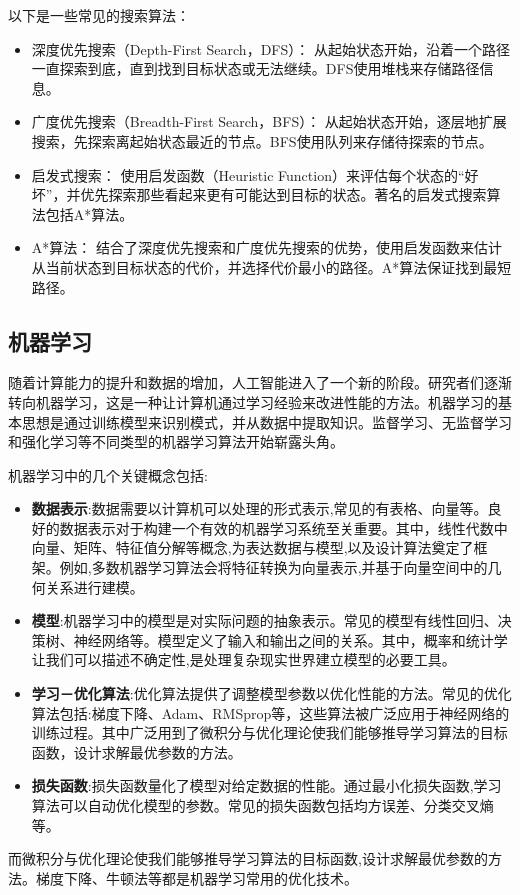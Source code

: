 以下是一些常见的搜索算法：
\begin{itemize}
\item 深度优先搜索（Depth-First Search，DFS）： 从起始状态开始，沿着一个路径一直探索到底，直到找到目标状态或无法继续。DFS使用堆栈来存储路径信息。
\item 广度优先搜索（Breadth-First Search，BFS）： 从起始状态开始，逐层地扩展搜索，先探索离起始状态最近的节点。BFS使用队列来存储待探索的节点。
\item 启发式搜索： 使用启发函数（Heuristic Function）来评估每个状态的“好坏”，并优先探索那些看起来更有可能达到目标的状态。著名的启发式搜索算法包括A*算法。
\item A*算法： 结合了深度优先搜索和广度优先搜索的优势，使用启发函数来估计从当前状态到目标状态的代价，并选择代价最小的路径。A*算法保证找到最短路径。
\end{itemize}

\subsection{机器学习}

随着计算能力的提升和数据的增加，人工智能进入了一个新的阶段。研究者们逐渐转向机器学习，这是一种让计算机通过学习经验来改进性能的方法。机器学习的基本思想是通过训练模型来识别模式，并从数据中提取知识。监督学习、无监督学习和强化学习等不同类型的机器学习算法开始崭露头角。

机器学习中的几个关键概念包括:
\begin{itemize}
\item \textbf{数据表示}:数据需要以计算机可以处理的形式表示,常见的有表格、向量等。良好的数据表示对于构建一个有效的机器学习系统至关重要。其中，线性代数中向量、矩阵、特征值分解等概念,为表达数据与模型,以及设计算法奠定了框架。例如,多数机器学习算法会将特征转换为向量表示,并基于向量空间中的几何关系进行建模。

\item \textbf{模型}:机器学习中的模型是对实际问题的抽象表示。常见的模型有线性回归、决策树、神经网络等。模型定义了输入和输出之间的关系。其中，概率和统计学让我们可以描述不确定性,是处理复杂现实世界建立模型的必要工具。

\item \textbf{学习－优化算法}:优化算法提供了调整模型参数以优化性能的方法。常见的优化算法包括:梯度下降、Adam、RMSprop等，这些算法被广泛应用于神经网络的训练过程。其中广泛用到了微积分与优化理论使我们能够推导学习算法的目标函数，设计求解最优参数的方法。

\item \textbf{损失函数}:损失函数量化了模型对给定数据的性能。通过最小化损失函数,学习算法可以自动优化模型的参数。常见的损失函数包括均方误差、分类交叉熵等。
\end{itemize}




而微积分与优化理论使我们能够推导学习算法的目标函数,设计求解最优参数的方法。梯度下降、牛顿法等都是机器学习常用的优化技术。